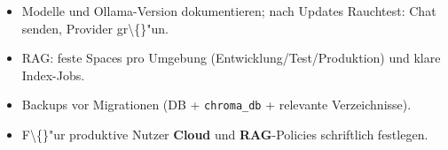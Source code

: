 \begin{itemize}
\item Modelle und Ollama-Version dokumentieren; nach Updates Rauchtest: Chat senden, Provider gr\textbackslash\{\}"un.
\item RAG: feste Spaces pro Umgebung (Entwicklung/Test/Produktion) und klare Index-Jobs.
\item Backups vor Migrationen (DB + \texttt{chroma\_db} + relevante Verzeichnisse).
\item F\textbackslash\{\}"ur produktive Nutzer \textbf{Cloud} und \textbf{RAG}-Policies schriftlich festlegen.
\end{itemize}
